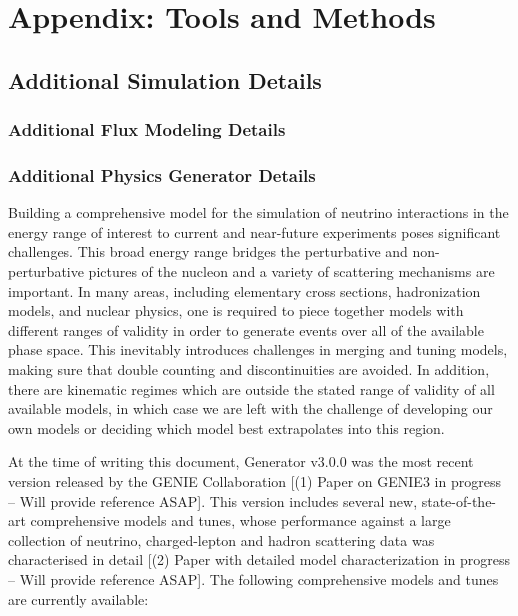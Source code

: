 \section{Appendix: Tools and Methods}
\label{sec:tools-appendix}

\subsection{Additional Simulation Details}

\subsubsection{Additional Flux Modeling Details}
\label{sec:tools-app-flx}


\subsubsection{Additional Physics Generator Details}
\label{sec:tools-app-generator}

Building a comprehensive model for the simulation of neutrino interactions in the energy range of interest to current and near-future experiments poses significant challenges. This broad energy range bridges the perturbative and non-perturbative pictures of the nucleon and a variety of scattering mechanisms are important. In many areas, including elementary cross sections, hadronization models, and nuclear physics, one is required to piece together models with different ranges of validity in order to generate events over all of the available phase space. This inevitably introduces challenges in merging and tuning models, making sure that double counting and discontinuities are avoided. In addition, there are kinematic regimes which are outside the stated range of validity of all available models, in which case we are left with the challenge of developing our own models or deciding which model best extrapolates into this region. 

At the time of writing this document, Generator v3.0.0 was the most recent version released by the GENIE Collaboration [(1) Paper on GENIE3 in progress -- Will provide reference ASAP]. This version includes several new, state-of-the-art comprehensive models and tunes, whose performance against a large collection of neutrino, charged-lepton and hadron scattering data was characterised in detail [(2) Paper with detailed model characterization in progress -- Will provide reference ASAP]. The following comprehensive models and tunes are currently available:

